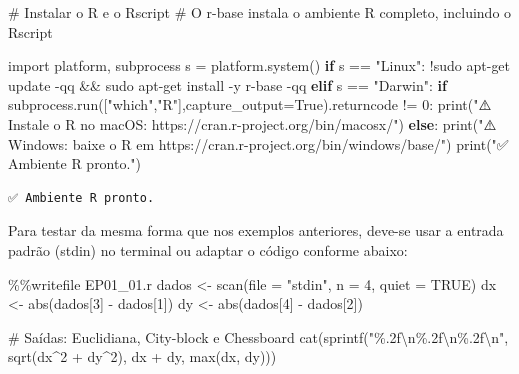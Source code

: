 \documentclass[
  portuguese,
  letterpaper,
  openany,
  oneside,
  12pt,
  a4paper]{book}
\newenvironment{Shaded}{\begin{snugshade}}{\end{snugshade}}
\newcommand{\BuiltInTok}[1]{\textcolor[rgb]{0.00,0.23,0.31}{#1}}
\newcommand{\CharTok}[1]{\textcolor[rgb]{0.13,0.47,0.30}{#1}}
\newcommand{\CommentTok}[1]{\textcolor[rgb]{0.37,0.37,0.37}{#1}}
\newcommand{\ControlFlowTok}[1]{\textcolor[rgb]{0.00,0.23,0.31}{\textbf{#1}}}
\newcommand{\DecValTok}[1]{\textcolor[rgb]{0.68,0.00,0.00}{#1}}
\newcommand{\ImportTok}[1]{\textcolor[rgb]{0.00,0.46,0.62}{#1}}
\newcommand{\NormalTok}[1]{\textcolor[rgb]{0.00,0.23,0.31}{#1}}
\newcommand{\OperatorTok}[1]{\textcolor[rgb]{0.37,0.37,0.37}{#1}}
\newcommand{\SpecialCharTok}[1]{\textcolor[rgb]{0.37,0.37,0.37}{#1}}
\newcommand{\StringTok}[1]{\textcolor[rgb]{0.13,0.47,0.30}{#1}}
\newcommand{\VariableTok}[1]{\textcolor[rgb]{0.07,0.07,0.07}{#1}}
\begin{document}
\begin{Shaded}
\begin{Highlighting}[]
\CommentTok{\# Instalar o R e o Rscript}
\CommentTok{\# O r{-}base instala o ambiente R completo, incluindo o Rscript}

\ImportTok{import}\NormalTok{ platform, subprocess}
\NormalTok{s }\OperatorTok{=}\NormalTok{ platform.system()}
\ControlFlowTok{if}\NormalTok{ s }\OperatorTok{==} \StringTok{"Linux"}\NormalTok{:}
    \OperatorTok{!}\NormalTok{sudo apt}\OperatorTok{{-}}\NormalTok{get update }\OperatorTok{{-}}\NormalTok{qq }\OperatorTok{\&\&}\NormalTok{ sudo apt}\OperatorTok{{-}}\NormalTok{get install }\OperatorTok{{-}}\NormalTok{y r}\OperatorTok{{-}}\NormalTok{base }\OperatorTok{{-}}\NormalTok{qq}
\ControlFlowTok{elif}\NormalTok{ s }\OperatorTok{==} \StringTok{"Darwin"}\NormalTok{:}
    \ControlFlowTok{if}\NormalTok{ subprocess.run([}\StringTok{"which"}\NormalTok{,}\StringTok{"R"}\NormalTok{],capture\_output}\OperatorTok{=}\VariableTok{True}\NormalTok{).returncode }\OperatorTok{!=} \DecValTok{0}\NormalTok{:}
        \BuiltInTok{print}\NormalTok{(}\StringTok{"⚠️ Instale o R no macOS: https://cran.r{-}project.org/bin/macosx/"}\NormalTok{)}
\ControlFlowTok{else}\NormalTok{:}
    \BuiltInTok{print}\NormalTok{(}\StringTok{"⚠️ Windows: baixe o R em https://cran.r{-}project.org/bin/windows/base/"}\NormalTok{)}
\BuiltInTok{print}\NormalTok{(}\StringTok{"✅ Ambiente R pronto."}\NormalTok{)}
\end{Highlighting}
\end{Shaded}

\begin{verbatim}
✅ Ambiente R pronto.
\end{verbatim}

Para testar da mesma forma que nos exemplos anteriores, deve-se usar a
entrada padrão (stdin) no terminal ou adaptar o código conforme abaixo:

\begin{Shaded}
\begin{Highlighting}[]
\OperatorTok{\%\%}\NormalTok{writefile EP01\_01.r}
\NormalTok{dados }\OperatorTok{\textless{}{-}}\NormalTok{ scan(}\BuiltInTok{file} \OperatorTok{=} \StringTok{"stdin"}\NormalTok{, n }\OperatorTok{=} \DecValTok{4}\NormalTok{, quiet }\OperatorTok{=}\NormalTok{ TRUE)}
\NormalTok{dx }\OperatorTok{\textless{}{-}} \BuiltInTok{abs}\NormalTok{(dados[}\DecValTok{3}\NormalTok{] }\OperatorTok{{-}}\NormalTok{ dados[}\DecValTok{1}\NormalTok{])}
\NormalTok{dy }\OperatorTok{\textless{}{-}} \BuiltInTok{abs}\NormalTok{(dados[}\DecValTok{4}\NormalTok{] }\OperatorTok{{-}}\NormalTok{ dados[}\DecValTok{2}\NormalTok{])}

\CommentTok{\# Saídas: Euclidiana, City{-}block e Chessboard}
\NormalTok{cat(sprintf(}\StringTok{"}\SpecialCharTok{\%.2f}\CharTok{\textbackslash{}n}\SpecialCharTok{\%.2f}\CharTok{\textbackslash{}n}\SpecialCharTok{\%.2f}\CharTok{\textbackslash{}n}\StringTok{"}\NormalTok{, }
\NormalTok{    sqrt(dx}\OperatorTok{\^{}}\DecValTok{2} \OperatorTok{+}\NormalTok{ dy}\OperatorTok{\^{}}\DecValTok{2}\NormalTok{), }
\NormalTok{    dx }\OperatorTok{+}\NormalTok{ dy, }
    \BuiltInTok{max}\NormalTok{(dx, dy)))}
\end{Highlighting}
\end{Shaded}
\end{document}
